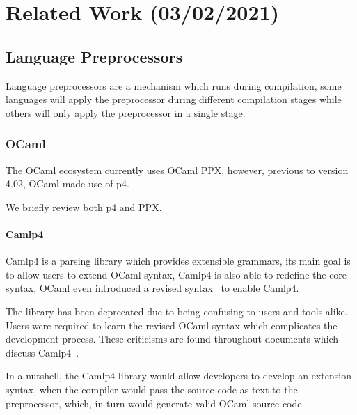\chapter{Related Work (03/02/2021)}\label{cha:related-work}

\section{Language Preprocessors}\label{sec:lang-preprocessors}

Language preprocessors are a mechanism which runs during compilation,
some languages will apply the preprocessor during different compilation stages while others will only apply the preprocessor in a single stage.


\subsection{OCaml}\label{sec:lang-preprocessors:ocaml}

The OCaml ecosystem currently uses OCaml \gls{PPX},
however, previous to version 4.02, OCaml made use of \gls{p4}.

We briefly review both \gls{p4} and \gls{PPX}.

\subsubsection*{Camlp4}\label{sec:lang-preprocessors:ocaml:p4}

Camlp4 is a parsing library which provides extensible grammars,
its main goal is to allow users to extend OCaml syntax,
Camlp4 is also able to redefine the core syntax,
OCaml even introduced a revised syntax~\autocite{Rauglaudre2003} to enable Camlp4.

The library has been deprecated due to being confusing to users and tools alike.
Users were required to learn the revised OCaml syntax which complicates the development process.
These criticisms are found throughout documents which discuss Camlp4~\autocite{Whitequark2014}.

In a nutshell, the Camlp4 library would allow developers to develop an extension syntax,
when the compiler would pass the source code as text to the preprocessor,
which, in turn would generate valid OCaml source code.

